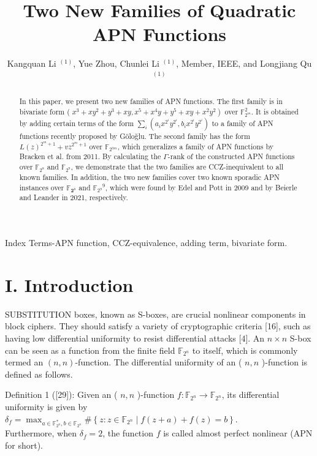 \documentclass[10pt]{article}
\title{Two New Families of Quadratic APN Functions }
\author{Kangquan Li ${ }^{(1)}$, Yue Zhou, Chunlei Li ${ }^{(1)}$, Member, IEEE, and Longjiang Qu ${ }^{(1)}$}
\date{}
\begin{document}
\maketitle
\captionsetup{singlelinecheck=false}


\begin{abstract}
In this paper, we present two new families of APN functions. The first family is in bivariate form ( $x^{3}+x y^{2}+ \left.y^{3}+x y, x^{5}+x^{4} y+y^{5}+x y+x^{2} y^{2}\right)$ over $\mathbb{F}_{2^{m}}^{2}$. It is obtained by adding certain terms of the form $\sum_{i}\left(a_{i} x^{2^{i}} y^{2^{i}}, b_{i} x^{2^{i}} y^{2^{i}}\right)$ to a family of APN functions recently proposed by Göloğlu. The second family has the form $L(z)^{2^{m}+1}+v z^{2^{m}+1}$ over $\mathbb{F}_{2^{3 m}}$, which generalizes a family of APN functions by Bracken et al. from 2011. By calculating the $\Gamma$-rank of the constructed APN functions over $\mathbb{F}_{2^{8}}$ and $\mathbb{F}_{2^{9}}$, we demonstrate that the two families are CCZ-inequivalent to all known families. In addition, the two new families cover two known sporadic APN instances over $\mathbb{F}_{\mathbf{2}^{8}}$ and $\mathbb{F}_{2^{9}}{ }^{9}$, which were found by Edel and Pott in 2009 and by Beierle and Leander in 2021, respectively.
\end{abstract}

Index Terms-APN function, CCZ-equivalence, adding term, bivariate form.

\section*{I. Introduction}
SUBSTITUTION boxes, known as S-boxes, are crucial nonlinear components in block ciphers. They should satisfy a variety of cryptographic criteria [16], such as having low differential uniformity to resist differential attacks [4]. An $n \times n$ S-box can be seen as a function from the finite field $\mathbb{F}_{2^{n}}$ to itself, which is commonly termed an $(n, n)$-function. The differential uniformity of an ( $n, n$ )-function is defined as follows.

Definition 1 ([29]): Given an ( $n, n$ )-function $f: \mathbb{F}_{2^{n}} \rightarrow \mathbb{F}_{2^{n}}$, its differential uniformity is given by\\
$\delta_{f}=\max _{a \in \mathbb{F}_{2^{n}}^{*}, b \in \mathbb{F}_{2^{n}}} \#\left\{z: z \in \mathbb{F}_{2^{n}} \mid f(z+a)+f(z)=b\right\}$.\\
Furthermore, when $\delta_{f}=2$, the function $f$ is called almost perfect nonlinear (APN for short).
\end{document}
